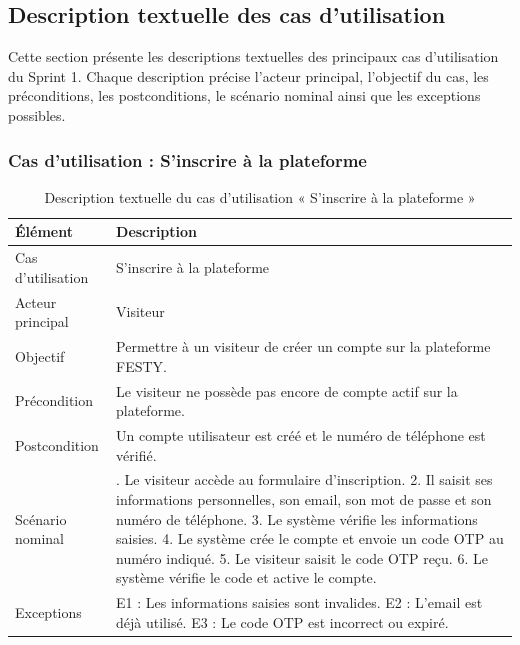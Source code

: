 \subsection{Description textuelle des cas d’utilisation}


Cette section présente les descriptions textuelles des principaux cas d’utilisation du Sprint 1. Chaque description précise l’acteur principal, l’objectif du cas, les préconditions, les postconditions, le scénario nominal ainsi que les exceptions possibles.


\subsubsection{Cas d’utilisation : S’inscrire à la plateforme}


\begin{table}[H]
\centering
\caption{Description textuelle du cas d’utilisation « S’inscrire à la plateforme »}
\label{tableau:3-2}
\renewcommand{\arraystretch}{1.2}
\begin{tabularx}{\textwidth}{|>{\raggedright\arraybackslash}X|>{\raggedright\arraybackslash}X|}
\hline
\rowcolor[HTML]{ECF4FF}
\textbf{Élément} & \textbf{Description} \\
\hline
Cas d’utilisation & S’inscrire à la plateforme \\
\hline
Acteur principal & Visiteur \\
\hline
Objectif & Permettre à un visiteur de créer un compte sur la plateforme FESTY. \\
\hline
Précondition & Le visiteur ne possède pas encore de compte actif sur la plateforme. \\
\hline
Postcondition & Un compte utilisateur est créé et le numéro de téléphone est vérifié. \\
\hline
Scénario nominal & 1. Le visiteur accède au formulaire d’inscription.\newline{} 2. Il saisit ses informations personnelles, son email, son mot de passe et son numéro de téléphone.\newline{} 3. Le système vérifie les informations saisies.\newline{} 4. Le système crée le compte et envoie un code OTP au numéro indiqué.\newline{} 5. Le visiteur saisit le code OTP reçu.\newline{} 6. Le système vérifie le code et active le compte. \\
\hline
Exceptions & E1 : Les informations saisies sont invalides.\newline{} E2 : L’email est déjà utilisé.\newline{} E3 : Le code OTP est incorrect ou expiré. \\
\hline
\end{tabularx}
\end{table}


